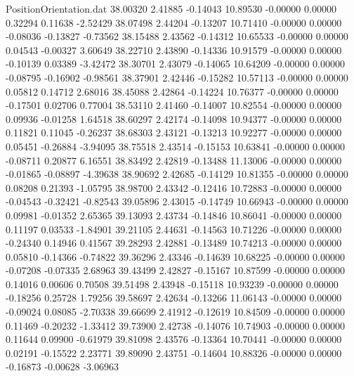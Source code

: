 \begin{filecontents}{PositionOrientation.dat}
  38.00320    2.41885   -0.14043    10.89530   -0.00000    0.00000    0.32294    0.11638   -2.52429
  38.07498    2.44204   -0.13207    10.71410   -0.00000    0.00000   -0.08036   -0.13827   -0.73562
  38.15488    2.43562   -0.14312    10.65533   -0.00000    0.00000    0.04543   -0.00327    3.60649
  38.22710    2.43890   -0.14336    10.91579   -0.00000    0.00000   -0.10139    0.03389   -3.42472
  38.30701    2.43079   -0.14065    10.64209   -0.00000    0.00000   -0.08795   -0.16902   -0.98561
  38.37901    2.42446   -0.15282    10.57113   -0.00000    0.00000    0.05812    0.14712    2.68016
  38.45088    2.42864   -0.14224    10.76377   -0.00000    0.00000   -0.17501    0.02706    0.77004
  38.53110    2.41460   -0.14007    10.82554   -0.00000    0.00000    0.09936   -0.01258    1.64518
  38.60297    2.42174   -0.14098    10.94377   -0.00000    0.00000    0.11821    0.11045   -0.26237
  38.68303    2.43121   -0.13213    10.92277   -0.00000    0.00000    0.05451   -0.26884   -3.94095
  38.75518    2.43514   -0.15153    10.63841   -0.00000    0.00000   -0.08711    0.20877    6.16551
  38.83492    2.42819   -0.13488    11.13006   -0.00000    0.00000   -0.01865   -0.08897   -4.39638
  38.90692    2.42685   -0.14129    10.81355   -0.00000    0.00000    0.08208    0.21393   -1.05795
  38.98700    2.43342   -0.12416    10.72883   -0.00000    0.00000   -0.04543   -0.32421   -0.82543
  39.05896    2.43015   -0.14749    10.66943   -0.00000    0.00000    0.09981   -0.01352    2.65365
  39.13093    2.43734   -0.14846    10.86041   -0.00000    0.00000    0.11197    0.03533   -1.84901
  39.21105    2.44631   -0.14563    10.71226   -0.00000    0.00000   -0.24340    0.14946    0.41567
  39.28293    2.42881   -0.13489    10.74213   -0.00000    0.00000    0.05810   -0.14366   -0.74822
  39.36296    2.43346   -0.14639    10.68225   -0.00000    0.00000   -0.07208   -0.07335    2.68963
  39.43499    2.42827   -0.15167    10.87599   -0.00000    0.00000    0.14016    0.00606    0.70508
  39.51498    2.43948   -0.15118    10.93239   -0.00000    0.00000   -0.18256    0.25728    1.79256
  39.58697    2.42634   -0.13266    11.06143   -0.00000    0.00000   -0.09024    0.08085   -2.70338
  39.66699    2.41912   -0.12619    10.84509   -0.00000    0.00000    0.11469   -0.20232   -1.33412
  39.73900    2.42738   -0.14076    10.74903   -0.00000    0.00000    0.11644    0.09900   -0.61979
  39.81098    2.43576   -0.13364    10.70441   -0.00000    0.00000    0.02191   -0.15522    2.23771
  39.89090    2.43751   -0.14604    10.88326   -0.00000    0.00000   -0.16873   -0.00628   -3.06963

\end{filecontents}
